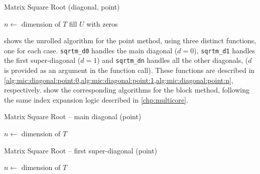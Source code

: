 \documentclass[../thesis]{subfiles}
\begin{document}
	\begin{algorithm}[htp]
		\caption[Matrix Square Root Unrolled (diagonal, point)]{Matrix Square Root (diagonal, point)}
		\label{alg:mic:diagonal:point}
		\DontPrintSemicolon



		$n \leftarrow$ dimension of $T$\;
		fill $U$ with zeros\;

		\;
		\;
	\end{algorithm}

	 shows the unrolled algorithm for the point method, using three distinct functions, one for each case. \texttt{sqrtm\_d0} handles the main diagonal ($d = 0$), \texttt{sqrtm\_d1} handles the first super-diagonal ($d = 1$) and \texttt{sqrtm\_dn} handles all the other diagonals, ($d$ is provided as an argument in the function call). These functions are described in \cref{alg:mic:diagonal:point:0,alg:mic:diagonal:point:1,alg:mic:diagonal:point:n}, respectively.  show the corresponding algorithms for the block method, following the same index expansion logic described in \cref{chp:multicore}.

	\begin{algorithm}[htp]
		\caption{Matrix Square Root -- main diagonal (point)}
		\label{alg:mic:diagonal:point:0}
		\DontPrintSemicolon


		$n \leftarrow$ dimension of $T$\;

	\end{algorithm}

	\begin{algorithm}[htp]
		\caption{Matrix Square Root -- first super-diagonal (point)}
		\label{alg:mic:diagonal:point:1}
		\DontPrintSemicolon


		$n \leftarrow$ dimension of $T$\;

	\end{algorithm}
\end{document}

